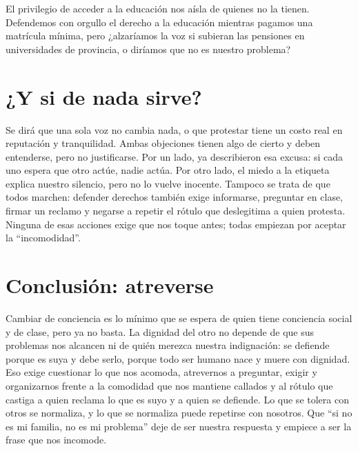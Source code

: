 \documentclass[10pt,a4paper]{article}
\begin{document}
El privilegio de acceder a la educación nos aísla de quienes no la tienen. Defendemos con orgullo el derecho a la educación mientras pagamos una matrícula mínima, pero ¿alzaríamos la voz si subieran las pensiones en universidades de provincia, o diríamos que no es nuestro problema?

\section*{¿Y si de nada sirve?}

Se dirá que una sola voz no cambia nada, o que protestar tiene un costo real en
reputación y tranquilidad. Ambas objeciones tienen algo de cierto y deben entenderse, pero no justificarse. Por un lado, \textcite{darley1968} ya describieron esa excusa: si cada uno espera que otro actúe, nadie actúa. Por otro lado, el miedo a la etiqueta explica nuestro silencio, pero no lo vuelve inocente. Tampoco se trata de que todos marchen: defender derechos
también exige informarse, preguntar en clase, firmar un reclamo y negarse a
repetir el rótulo que deslegitima a quien protesta. Ninguna de esas acciones
exige que nos toque antes; todas empiezan por aceptar la \enquote{incomodidad}.

\section*{Conclusión: atreverse}
Cambiar de conciencia es lo mínimo que se espera de quien tiene conciencia
social y de clase, pero ya no basta. La dignidad del otro no depende de que sus problemas nos
alcancen ni de quién merezca nuestra indignación: se defiende porque es suya y debe serlo, porque todo ser humano nace y muere con dignidad. Eso
exige cuestionar lo que nos acomoda, atrevernos a preguntar, exigir y
organizarnos frente a la comodidad que
nos mantiene callados y al rótulo que castiga a quien reclama lo que es suyo y a quien se defiende. Lo que se tolera
con otros se normaliza, y lo que se normaliza puede repetirse con nosotros. Que
\enquote{si no es mi familia, no es mi problema} deje de ser nuestra respuesta
y empiece a ser la frase que nos incomode.
\clearpage
\printbibliography[title={Referencias}]

\clearpage
\appendix
\renewcommand{\thesection}{Anexo \Alph{section}}
\end{document}
